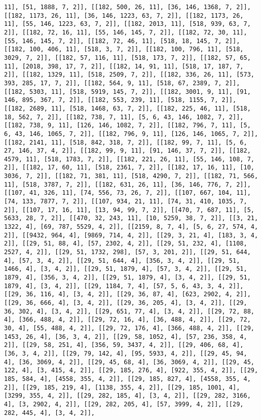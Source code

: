 \documentclass[12pt,fleqn]{article}\usepackage{../../common}
\begin{document}
\begin{verbatim}
11], [51, 1888, 7, 2]], [[182, 500, 26, 11], [36, 146, 1368, 7, 2]], [[182, 1173, 26, 11], [36, 146, 1223, 63, 7, 2]], [[182, 1173, 26, 11], [55, 146, 1223, 63, 7, 2]], [[182, 2013, 11], [518, 939, 63, 7, 2]], [[182, 72, 16, 11], [55, 146, 145, 7, 2]], [[182, 72, 30, 11], [55, 146, 145, 7, 2]], [[182, 72, 46, 11], [518, 18, 145, 7, 2]], [[182, 100, 406, 11], [518, 3, 7, 2]], [[182, 100, 796, 11], [518, 3029, 7, 2]], [[182, 57, 116, 11], [518, 173, 7, 2]], [[182, 57, 65, 11], [2018, 398, 17, 7, 2]], [[182, 14, 91, 11], [518, 17, 187, 7, 2]], [[182, 1329, 11], [518, 2509, 7, 2]], [[182, 336, 26, 11], [573, 393, 285, 17, 7, 2]], [[182, 564, 9, 11], [518, 67, 2389, 7, 2]], [[182, 5303, 11], [518, 5919, 145, 7, 2]], [[182, 3001, 9, 11], [91, 146, 895, 367, 7, 2]], [[182, 553, 239, 11], [518, 1155, 7, 2]], [[182, 2689, 11], [518, 1468, 63, 7, 2]], [[182, 225, 46, 11], [518, 18, 562, 7, 2]], [[182, 738, 7, 11], [5, 6, 43, 146, 1082, 7, 2]], [[182, 738, 9, 11], [126, 146, 1082, 7, 2]], [[182, 796, 7, 11], [5, 6, 43, 146, 1065, 7, 2]], [[182, 796, 9, 11], [126, 146, 1065, 7, 2]], [[182, 2141, 11], [518, 842, 318, 7, 2]], [[182, 99, 7, 11], [5, 6, 27, 146, 37, 4, 2]], [[182, 99, 9, 11], [91, 146, 37, 7, 2]], [[182, 4579, 11], [518, 1783, 7, 2]], [[182, 221, 26, 11], [55, 146, 108, 7, 2]], [[182, 17, 60, 11], [518, 2361, 7, 2]], [[182, 17, 16, 11], [10, 3036, 7, 2]], [[182, 71, 381, 11], [518, 4290, 7, 2]], [[182, 71, 566, 11], [518, 3787, 7, 2]], [[182, 631, 26, 11], [36, 146, 776, 7, 2]], [[107, 41, 326, 11], [74, 556, 73, 26, 7, 2]], [[107, 667, 104, 11], [74, 133, 7877, 7, 2]], [[107, 934, 21, 11], [74, 31, 410, 1035, 7, 2]], [[107, 17, 16, 11], [13, 94, 99, 7, 2]], [[470, 7, 687, 11], [5, 5633, 28, 7, 2]], [[470, 32, 243, 11], [10, 5259, 38, 7, 2]], [[3, 21, 1322, 4], [69, 787, 5529, 4, 2]], [[2159, 8, 7, 4], [5, 6, 27, 574, 4, 2]], [[9432, 964, 4], [9869, 714, 4, 2]], [[29, 3, 21, 4], [183, 3, 4, 2]], [[29, 51, 88, 4], [57, 2302, 4, 2]], [[29, 51, 232, 4], [1108, 2527, 4, 2]], [[29, 51, 1732, 298], [57, 3, 201, 2]], [[29, 51, 644, 4], [57, 3, 4, 2]], [[29, 51, 644, 4], [356, 3, 4, 2]], [[29, 51, 1466, 4], [3, 4, 2]], [[29, 51, 1879, 4], [57, 3, 4, 2]], [[29, 51, 1879, 4], [356, 3, 4, 2]], [[29, 51, 1879, 4], [3, 4, 2]], [[29, 51, 1879, 4], [3, 4, 2]], [[29, 1184, 7, 4], [57, 5, 6, 43, 3, 4, 2]], [[29, 36, 116, 4], [3, 4, 2]], [[29, 36, 87, 4], [623, 2902, 4, 2]], [[29, 36, 666, 4], [3, 4, 2]], [[29, 36, 205, 4], [3, 4, 2]], [[29, 36, 302, 4], [3, 4, 2]], [[29, 651, 77, 4], [3, 4, 2]], [[29, 72, 88, 4], [366, 488, 4, 2]], [[29, 72, 16, 4], [36, 488, 4, 2]], [[29, 72, 30, 4], [55, 488, 4, 2]], [[29, 72, 176, 4], [366, 488, 4, 2]], [[29, 1453, 26, 4], [36, 3, 4, 2]], [[29, 58, 1052, 4], [57, 236, 358, 4, 2]], [[29, 58, 251, 4], [356, 59, 3437, 4, 2]], [[29, 406, 68, 4], [36, 3, 4, 2]], [[29, 79, 142, 4], [95, 5933, 4, 2]], [[29, 45, 94, 4], [36, 3069, 4, 2]], [[29, 45, 68, 4], [36, 3069, 4, 2]], [[29, 45, 122, 4], [3, 415, 4, 2]], [[29, 185, 276, 4], [922, 355, 4, 2]], [[29, 185, 584, 4], [4558, 355, 4, 2]], [[29, 185, 827, 4], [4558, 355, 4, 2]], [[29, 185, 219, 4], [1138, 355, 4, 2]], [[29, 185, 1001, 4], [3299, 355, 4, 2]], [[29, 282, 185, 4], [3, 4, 2]], [[29, 282, 3166, 4], [3, 2902, 4, 2]], [[29, 282, 205, 4], [57, 3999, 4, 2]], [[29, 282, 445, 4], [3, 4, 2]], 
\end{verbatim}
\end{document}
